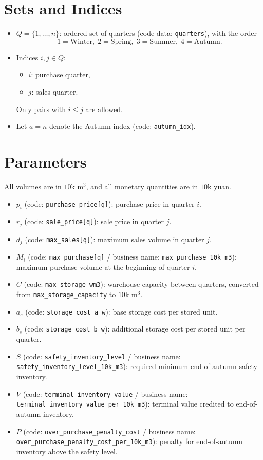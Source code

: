 \section*{Sets and Indices}

\begin{itemize}
    \item $Q=\{1,\dots,n\}$: ordered set of quarters (code data: \texttt{quarters}), with the order
    \[
    1=\text{Winter},\;2=\text{Spring},\;3=\text{Summer},\;4=\text{Autumn}.
    \]
    \item Indices $i,j \in Q$:
    \begin{itemize}
        \item $i$: purchase quarter,
        \item $j$: sales quarter.
    \end{itemize}
    Only pairs with $i \le j$ are allowed.
    \item Let $a=n$ denote the Autumn index (code: \texttt{autumn\_idx}).
\end{itemize}

\section*{Parameters}

All volumes are in $10$k m$^3$, and all monetary quantities are in $10$k yuan.

\begin{itemize}
    \item $p_i$ (code: \texttt{purchase\_price[q]}): purchase price in quarter $i$.
    \item $r_j$ (code: \texttt{sale\_price[q]}): sale price in quarter $j$.
    \item $d_j$ (code: \texttt{max\_sales[q]}): maximum sales volume in quarter $j$.
    \item $M_i$ (code: \texttt{max\_purchase[q]} / business name: \texttt{max\_purchase\_10k\_m3}): maximum purchase volume at the beginning of quarter $i$.
    \item $C$ (code: \texttt{max\_storage\_wm3}): warehouse capacity between quarters, converted from \texttt{max\_storage\_capacity} to $10$k m$^3$.
    \item $a_s$ (code: \texttt{storage\_cost\_a\_w}): base storage cost per stored unit.
    \item $b_s$ (code: \texttt{storage\_cost\_b\_w}): additional storage cost per stored unit per quarter.
    \item $S$ (code: \texttt{safety\_inventory\_level} / business name: \texttt{safety\_inventory\_level\_10k\_m3}): required minimum end-of-autumn safety inventory.
    \item $V$ (code: \texttt{terminal\_inventory\_value} / business name: \texttt{terminal\_inventory\_value\_per\_10k\_m3}): terminal value credited to end-of-autumn inventory.
    \item $P$ (code: \texttt{over\_purchase\_penalty\_cost} / business name: \texttt{over\_purchase\_penalty\_cost\_per\_10k\_m3}): penalty for end-of-autumn inventory above the safety level.
\end{itemize}

